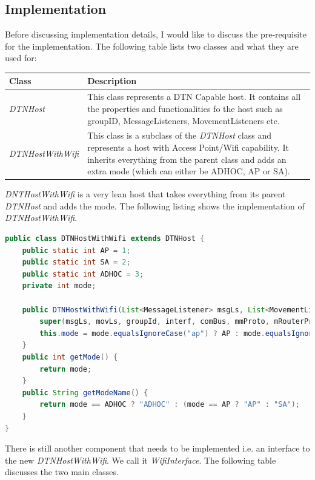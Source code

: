 \subsection{Implementation}
Before discussing implementation details, I would like to discuss the pre-requisite for the implementation. The following table lists two classes and what they are used for:
	\begin{center}
	    \begin{tabular}{ | l | p{10.5cm} |}
    		\hline
    		\textbf{Class} & \textbf{Description} \\ \hline
    		\textit{DTNHost} & This class represents a DTN Capable host. It contains all the properties and functionalities fo the host such as groupID, MessageListeners, MovementListeners etc. \\ \hline
    		\textit{DTNHostWithWifi} & This class is a subclass of the \textit{DTNHost} class and represents a host with Access Point/Wifi capability. It inherits everything from the parent class and adds an extra mode (which can either be ADHOC, AP or SA). \\ \hline
    	\end{tabular}
	\end{center}
\vspace{3mm}
\textit{DNTHostWithWifi} is a very lean host that takes everything from its parent \textit{DTNHost} and adds the mode. The following listing shows the implementation of \textit{DTNHostWithWifi}.
\begin{lstlisting}[language=java]
public class DTNHostWithWifi extends DTNHost {
	public static int AP = 1;
	public static int SA = 2;
	public static int ADHOC = 3;
	private int mode;

	public DTNHostWithWifi(List<MessageListener> msgLs, List<MovementListener> movLs, String groupId,List<NetworkInterface> interf, ModuleCommunicationBus comBus, MovementModel mmProto, MessageRouter mRouterProto, String mode) {
		super(msgLs, movLs, groupId, interf, comBus, mmProto, mRouterProto);
		this.mode = mode.equalsIgnoreCase("ap") ? AP : mode.equalsIgnoreCase("sa") ? SA : ADHOC;
	}
	public int getMode() {
		return mode;
	}
	public String getModeName() {
		return mode == ADHOC ? "ADHOC" : (mode == AP ? "AP" : "SA");
	}
}
\end{lstlisting}
\vspace{5mm}
There is still another component that needs to be implemented i.e. an interface to the new \textit{DTNHostWithWifi}. We call it \textit{WifiInterface}. The following table discusses the two main classes.

